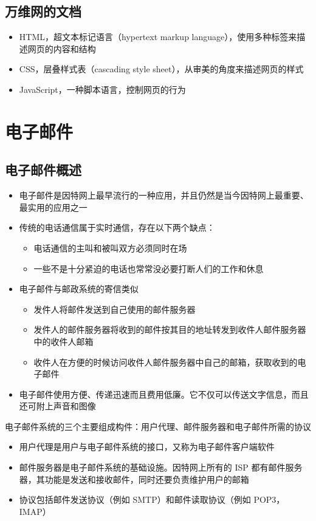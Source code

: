 \documentclass[cs4size,a4paper,10pt]{ctexart}
\begin{document}
	\subsection{万维网的文档}

	\begin{itemize}
		\item HTML，超文本标记语言（hypertext markup language），使用多种标签来描述网页的内容和结构
		\item CSS，层叠样式表（cascading style sheet），从审美的角度来描述网页的样式
		\item JavaScript，一种脚本语言，控制网页的行为
	\end{itemize}

	\section{电子邮件}

	\subsection{电子邮件概述}
	\begin{itemize}
		\item 电子邮件是因特网上最早流行的一种应用，并且仍然是当今因特网上最重要、最实用的应用之一
		\item 传统的电话通信属于实时通信，存在以下两个缺点：
		\begin{itemize}
			\item 电话通信的主叫和被叫双方必须同时在场
			\item 一些不是十分紧迫的电话也常常没必要打断人们的工作和休息
		\end{itemize}
		\item 电子邮件与邮政系统的寄信类似
		\begin{itemize}
			\item 发件人将邮件发送到自己使用的邮件服务器
			\item 发件人的邮件服务器将收到的邮件按其目的地址转发到收件人邮件服务器中的收件人邮箱
			\item 收件人在方便的时候访问收件人邮件服务器中自己的邮箱，获取收到的电子邮件
		\end{itemize}
		\item 电子邮件使用方便、传递迅速而且费用低廉。它不仅可以传送文字信息，而且还可附上声音和图像
	\end{itemize}

	电子邮件系统的三个主要组成构件：用户代理、邮件服务器和电子邮件所需的协议
	\begin{itemize}
		\item 用户代理是用户与电子邮件系统的接口，又称为电子邮件客户端软件
		\item 邮件服务器是电子邮件系统的基础设施。因特网上所有的 ISP 都有邮件服务器，其功能是发送和接收邮件，同时还要负责维护用户的邮箱
		\item 协议包括邮件发送协议（例如 SMTP）和邮件读取协议（例如 POP3，IMAP）
	\end{itemize}
\end{document}
